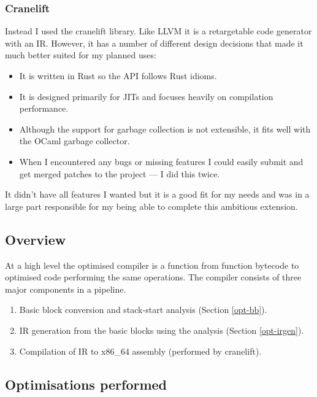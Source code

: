 \subsubsection{Cranelift}

Instead I used the cranelift library. Like LLVM it is a retargetable code generator with an IR.
However, it has a number of different design decisions that made it much better suited for my
planned uses:

\begin{itemize}
      \item It is written in Rust so the API follows Rust idioms.
      \item It is designed primarily for JITs and focuses heavily on compilation performance.
      \item Although the support for garbage collection is not extensible, it fits well with the
            OCaml garbage collector.
      \item When I encountered any bugs or missing features I could easily submit and get merged
            patches to the project --- I did this twice.
\end{itemize}

It didn't have all features I wanted but it is a good fit for my needs and was in a large part
responsible for my being able to complete this ambitious extension.

\subsection{Overview}

At a high level the optimised compiler is a function from function bytecode to optimised code
performing the same operations.  The compiler consists of three major components in a pipeline.

\begin{enumerate}
      \item Basic block conversion and stack-start analysis (Section \ref{opt-bb}).
      \item IR generation from the basic blocks using the analysis (Section \ref{opt-irgen}).
      \item Compilation of IR to x86\_64 assembly (performed by cranelift).
\end{enumerate}

\subsection{Optimisations performed}

